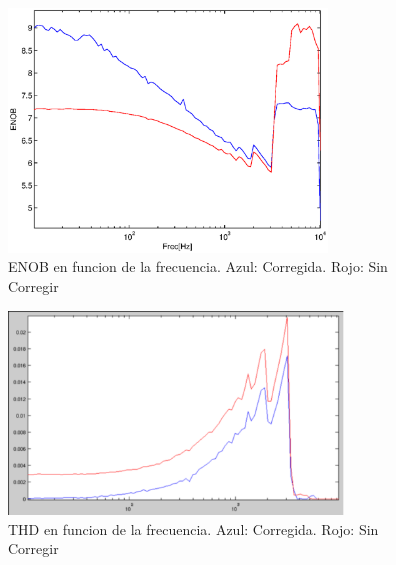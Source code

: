 \documentclass[a4paper,conference]{IEEEtran}
\begin{document}
\begin{figure}[!b]
\centering
\includegraphics[width=3.33in]{Medicion_ENOB}
\caption{ENOB en funcion de la frecuencia. Azul: Corregida. Rojo: Sin Corregir}
\label{fig:ENOB}
\end{figure}

\begin{figure}[!t]
\centering
\includegraphics[width=3.5in]{Medicion_THD}
\caption{THD en funcion de la frecuencia. Azul: Corregida. Rojo: Sin Corregir}
\label{fig:THD}
\end{figure}
\end{document}
